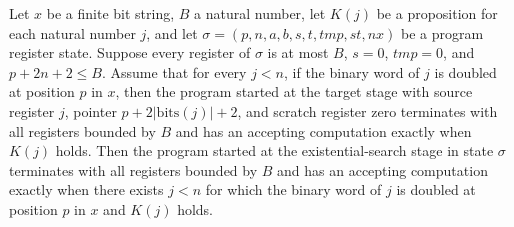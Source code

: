 \begin{lemma}
\label{Complexity.LogProg.ps_sphase}
\leanok
{}
Let $x$ be a finite bit string, $B$ a natural number, let $K(j)$ be a proposition for
each natural number $j$, and let $\sigma=(p,n,a,b,s,t,tmp,st,nx)$ be a program register
state. Suppose every register of $\sigma$ is at most $B$, $s=0$, $tmp=0$, and $p+2n+2\le B$.
Assume that for every $j<n$, if the binary word of $j$ is doubled at position $p$ in
$x$, then the program started at the target stage with source register $j$, pointer
$p+2|\mathrm{bits}(j)|+2$, and scratch register zero terminates with all registers
bounded by $B$ and has an accepting computation exactly when $K(j)$ holds. Then the
program started at the existential-search stage in state $\sigma$ terminates with all
registers bounded by $B$ and has an accepting computation exactly when there exists
$j<n$ for which the binary word of $j$ is doubled at position $p$ in $x$ and $K(j)$
holds.
\end{lemma}


